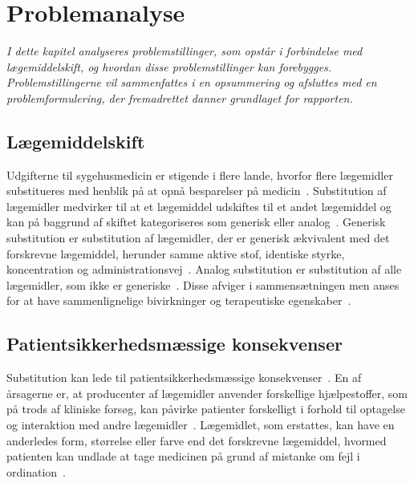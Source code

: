 \chapter{Problemanalyse}
\textit{I dette kapitel analyseres problemstillinger, som opstår i forbindelse med lægemiddelskift, og hvordan disse problemstillinger kan forebygges. Problemstillingerne vil sammenfattes i en opsummering og afsluttes med en problemformulering, der fremadrettet danner grundlaget for rapporten.}

\section{Lægemiddelskift}
Udgifterne til sygehusmedicin er stigende i flere lande, hvorfor flere lægemidler substitueres med henblik på at opnå besparelser på medicin~\citep{Ess2003,Johnston2011, Garcia2017}. Substitution af lægemidler medvirker til at et lægemiddel udskiftes til et andet lægemiddel og kan på baggrund af skiftet kategoriseres som generisk eller analog~\citep{DanskSelskabforPatientsikkerhed2009, Kairi2017}. Generisk substitution er substitution af lægemidler, der er  generisk ækvivalent med det forskrevne lægemiddel, herunder samme aktive stof, identiske styrke, koncentration og administrationsvej~\citep{DanskSelskabforPatientsikkerhed2009, Kairi2017, Lopes2012}. 
Analog substitution er substitution af alle lægemidler, som ikke er generiske~\citep{Kairi2017}. Disse afviger i sammensætningen men anses for at have sammenlignelige bivirkninger og terapeutiske egenskaber~\citep{DanskSelskabforPatientsikkerhed2009, Kairi2017}.


\section{Patientsikkerhedsmæssige konsekvenser} \label{sec:ProblemLaeg} 
Substitution kan lede til patientsikkerhedsmæssige konsekvenser~\citep{DanskSelskabforPatientsikkerhed2009}. En af årsagerne er, at producenter af lægemidler anvender forskellige hjælpestoffer, som på trods af kliniske forsøg, kan påvirke patienter forskelligt i forhold til optagelse og interaktion med andre lægemidler~\citep{Kairi2017}. Lægemidlet, som erstattes, kan have en anderledes form, størrelse eller farve end det forskrevne lægemiddel, hvormed patienten kan undlade at tage medicinen på grund af mistanke om fejl i ordination~\citep{Kairi2017}. 

